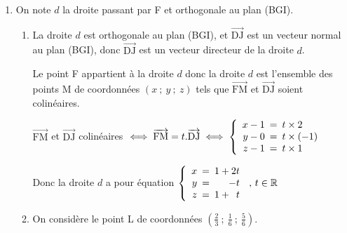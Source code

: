 \documentclass[10pt]{article}
\providecommand{\R}{\mathbb{R}}
\providecommand{\vvt}[1]{\overrightarrow{\mathrm{#1}}}
\begin{document}
\begin{enumerate}
\begin{enumerate}
		\item 
{}		

Donc une équation cartésienne du plan (BGI) est $2x - y + z - 2 = 0$.		
		
		
	\end{enumerate}
\item On note $d$ la droite passant par F et orthogonale au plan (BGI).
\begin{enumerate}
\item 
La droite $d$ est orthogonale au plan (BGI), et $\vvt{DJ}$ est un vecteur normal au plan (BGI), donc $\vvt{DJ}$ est un vecteur directeur de la droite $d$.

Le point F appartient à la droite $d$ donc la droite $d$ est l'ensemble des points M de coordonnées $(x~;~y~;~z)$ tels que $\vvt{FM}$ et $\vvt{DJ}$ soient colinéaires.

$\vvt{FM}$ et $\vvt{DJ}$ colinéaires
$\iff \vvt{FM}=t.\vvt{DJ}
\iff
\left\{
\begin{array}{r !{=} l}
x-1 & t \times 2\\
y-0 & t \times (-1)\\
z-1 & t\times 1
\end{array}
\right .$

Donc la droite $d$ a pour équation
$\left\{
\begin{array}{r !{=} r}
x&1+2t\\
y& -t\\
z &1+ \hphantom{2}t
\end{array}
\right . \,,\, t \in \R$

\item On considère le point L de coordonnées $\left(\frac{2}{3}~;~\frac{1}{6}~;~\frac{5}{6}\right)$.



\end{enumerate}
\end{enumerate}
\end{document}
